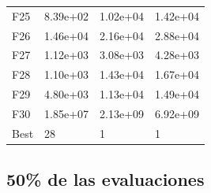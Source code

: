 \begin{table}[H]
\begin{minipage}{.5\linewidth}
\begin{tabular}{llll}
        F25  &  8.39e+02 &   1.02e+04 &  1.42e+04 \\
        F26  &  1.46e+04 &   2.16e+04 &  2.88e+04 \\
        F27  &  1.12e+03 &   3.08e+03 &  4.28e+03 \\
        F28  &  1.10e+03 &   1.43e+04 &  1.67e+04 \\
        F29  &  4.80e+03 &   1.13e+04 &  1.49e+04 \\
        F30  &  1.85e+07 &   2.13e+09 &  6.92e+09 \\
        Best &        28 &          1 &         1 \\
        \bottomrule
        \end{tabular}
        
    \end{minipage} 
\end{table}


\subsection*{50\% de las evaluaciones}

